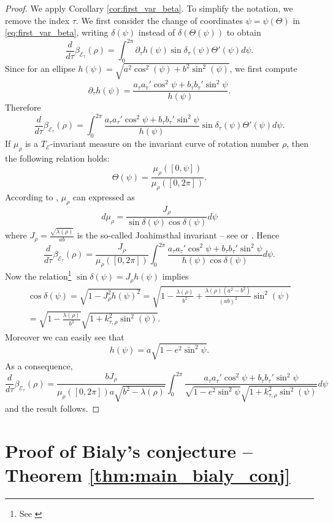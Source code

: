 \documentclass[a4paper]{article}
\theoremstyle{definition}
\begin{document}
\begin{proof}
We apply Corollary \ref{cor:first_var_beta}. To simplify the notation, we remove the index $\tau$. We first consider the change of coordinates $\psi =\psi(\Theta)$ in \eqref{eq:first_var_beta},  writing $\delta(\psi)$ instead of $\delta(\Theta(\psi))$ to obtain
\[
\frac{d}{d\tau}\beta_{\mathscr E_{\tau}}(\rho) = \int_0^{2\pi}\partial_{\tau}h(\psi)\sin\delta_{\tau}(\psi)\Theta'(\psi)d\psi.
\]
Since for an ellipse $h(\psi) = \sqrt{a^2\cos^2(\psi)+b^2\sin^2(\psi)}$, we first compute
\[
\partial_{\tau} h(\psi) = \frac{a_{\tau}a_{\tau}'\cos^2\psi+b_{\tau}b_{\tau}'\sin^2\psi}{h(\psi)}.
\]
Therefore
\[
\frac{d}{d\tau}\beta_{\mathscr E_{\tau}}(\rho) = \int_0^{2\pi}\frac{a_{\tau}a_{\tau}'\cos^2\psi+b_{\tau}b_{\tau}'\sin^2\psi}{h(\psi)}\sin\delta_{\tau}(\psi)\Theta'(\psi)d\psi.
\]
If $\mu_{\rho}$ is a $T_{\mathscr E}$-invariant measure on the invariant curve of rotation number $\rho$, then the following relation holds:
\[
\Theta(\psi) = \frac{\mu_{\rho}([0,\psi])}{\mu_{\rho}([0,2\pi])}.
\]
According to \cite[Formula (3) in the proof of Theorem 4.1]{Bialyellipses}, $\mu_{\rho}$
can expressed as
\[
d\mu_{\rho} = \frac{J_{\rho}}{\sin\delta(\psi)\cos\delta(\psi)}d\psi
\]
where $J_{\rho} = \frac{\sqrt{\lambda(\rho)}}{ab}$ is the so-called Joahimsthal invariant -- see \cite[Theorem 3.3]{Bialyellipses} or \cite{fierobeCMPLX}. Hence
\[
\frac{d}{d\tau}\beta_{\mathscr E_{\tau}}(\rho) = \frac{J_{\rho}}{\mu_{\rho}([0,2\pi])}\int_0^{2\pi}\frac{a_{\tau}a_{\tau}'\cos^2\psi+b_{\tau}b_{\tau}'\sin^2\psi}{h(\psi)\cos\delta(\psi)}d\psi.
\]
Now the relation\footnote{See \cite[Section 3.2]{Bialyellipses}} $\sin\delta(\psi) = J_{\rho}h(\psi)$ implies
\begin{multline}
\cos\delta(\psi)= \sqrt{1-J_{\rho}^2h(\psi)^2} = \sqrt{1-\frac{\lambda(\rho)}{b^2}+\frac{\lambda(\rho)(a^2-b^2)}{(ab)^2}\sin^2(\psi)}\\
= \sqrt{1-\frac{\lambda(\rho)}{b^2}}\sqrt{1+k_{\tau,\rho}^2\sin^2(\psi)}.
\end{multline}
Moreover we can easily see that
\[
h(\psi) = 
a\sqrt{1-e^2\sin^2\psi}.
\]
As a consequence,
\[
\frac{d}{d\tau}\beta_{\mathscr E_{\tau}}(\rho) = 
\frac{bJ_{\rho}}{\mu_{\rho}([0,2\pi])a\sqrt{b^2-\lambda(\rho)}}
\int_0^{2\pi}
\frac{a_{\tau}a_{\tau}'\cos^2\psi+b_{\tau}b_{\tau}'\sin^2\psi}
{\sqrt{1-e^2\sin^2\psi}\sqrt{1+k_{\tau,\rho}^2\sin^2(\psi)}}d\psi
\]
and the result follows.
\end{proof}

\section{Proof of Bialy's conjecture -- Theorem \ref{thm:main_bialy_conj}}
\label{sec:proof_Bialy_conj}
\end{document}
